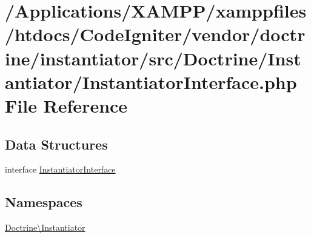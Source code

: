 \hypertarget{_instantiator_interface_8php}{}\section{/\+Applications/\+X\+A\+M\+P\+P/xamppfiles/htdocs/\+Code\+Igniter/vendor/doctrine/instantiator/src/\+Doctrine/\+Instantiator/\+Instantiator\+Interface.php File Reference}
\label{_instantiator_interface_8php}
\subsection*{Data Structures}
\begin{DoxyCompactItemize}
\item 
interface \mbox{\hyperlink{interface_doctrine_1_1_instantiator_1_1_instantiator_interface}{Instantiator\+Interface}}
\end{DoxyCompactItemize}
\subsection*{Namespaces}
\begin{DoxyCompactItemize}
\item 
 \mbox{\hyperlink{namespace_doctrine_1_1_instantiator}{Doctrine\textbackslash{}\+Instantiator}}
\end{DoxyCompactItemize}

